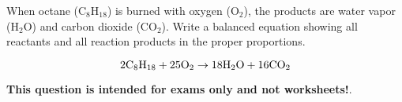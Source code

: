 

When octane (C$_{8}$H$_{18}$) is burned with oxygen (O$_{2}$), the products are water vapor (H$_{2}$O) and carbon dioxide (CO$_{2}$).  Write a balanced equation showing all reactants and all reaction products in the proper proportions.







$$\hbox{2C}_8\hbox{H}_{18} + \hbox{25O}_2 \to \hbox{18H}_2\hbox{O} + \hbox{16CO}_2$$







{\bf This question is intended for exams only and not worksheets!}.



